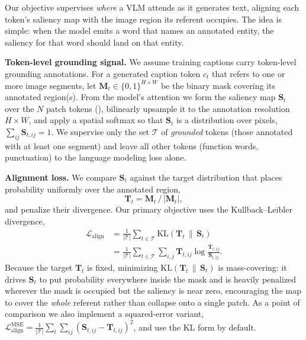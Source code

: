 Our objective supervises \emph{where} a VLM attends as it generates text, aligning each token's saliency map with the image region its referent occupies. The idea is simple: when the model emits a word that names an annotated entity, the saliency for that word should land on that entity.

\textbf{Token-level grounding signal.}
We assume training captions carry token-level grounding annotations. For a generated caption token $c_t$ that refers to one or more image segments, let $\mathbf{M}_t \in \{0,1\}^{H \times W}$ be the binary mask covering its annotated region(s). From the model's attention we form the saliency map $\mathbf{S}_t$ over the $N$ patch tokens (), bilinearly upsample it to the annotation resolution $H \times W$, and apply a spatial softmax so that $\mathbf{S}_t$ is a distribution over pixels, $\sum_{ij}\mathbf{S}_{t,ij}=1$. We supervise only the set $\mathcal{T}$ of \emph{grounded} tokens (those annotated with at least one segment) and leave all other tokens (function words, punctuation) to the language modeling loss alone.

\textbf{Alignment loss.}
We compare $\mathbf{S}_t$ against the target distribution that places probability uniformly over the annotated region,
\begin{equation}
\mathbf{T}_t = \mathbf{M}_t \,/\, |\mathbf{M}_t|,
\end{equation}
and penalize their divergence. Our primary objective uses the Kullback--Leibler divergence,
\begin{equation}
\begin{aligned}
\mathcal{L}_{\text{align}}
&= \frac{1}{|\mathcal{T}|} \sum_{t \in \mathcal{T}}
\mathrm{KL}\!\left(\mathbf{T}_t \,\|\, \mathbf{S}_t\right) \\
&= \frac{1}{|\mathcal{T}|} \sum_{t \in \mathcal{T}} \sum_{i,j}
\mathbf{T}_{t,ij} \log \frac{\mathbf{T}_{t,ij}}{\mathbf{S}_{t,ij}} .
\end{aligned}
\label{eq:align}
\end{equation}
Because the target $\mathbf{T}_t$ is fixed, minimizing $\mathrm{KL}(\mathbf{T}_t \,\|\, \mathbf{S}_t)$ is mass-covering: it drives $\mathbf{S}_t$ to put probability everywhere inside the mask and is heavily penalized wherever the mask is occupied but the saliency is near zero, encouraging the map to cover the \emph{whole} referent rather than collapse onto a single patch. As a point of comparison we also implement a squared-error variant, $\mathcal{L}_{\text{align}}^{\text{MSE}} = \frac{1}{|\mathcal{T}|}\sum_{t}\sum_{ij}(\mathbf{S}_{t,ij}-\mathbf{T}_{t,ij})^2$, and use the KL form by default.

